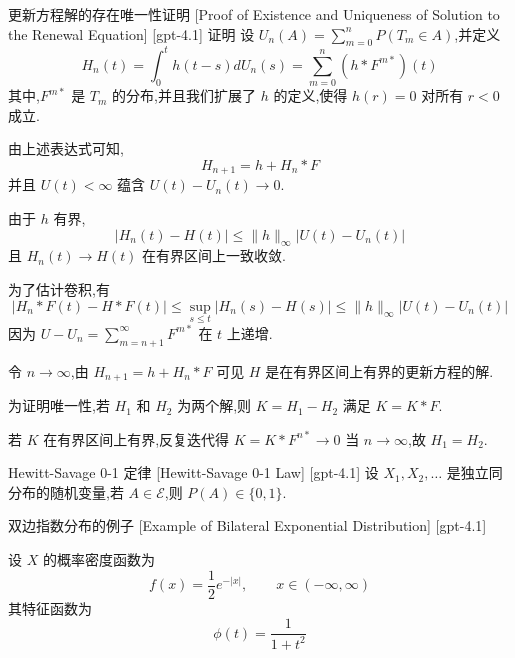 \documentclass[UTF8]{ctexart}
\begin{document}
    \begin{prf}
        {更新方程解的存在唯一性证明}
        [Proof of Existence and Uniqueness of Solution to the Renewal Equation]
        [gpt-4.1]
        证明 设 $U _ { n } ( A ) = \sum _ { m = 0 } ^ { n } P ( T _ { m } \in A )$,并定义
\[
H _ { n } ( t ) = \int _ { 0 } ^ { t } h ( t - s ) d U _ { n } ( s ) = \sum _ { m = 0 } ^ { n } \left( h * F ^ { m * } \right) ( t )
\]
其中,$F ^ { m * }$ 是 $T _ { m }$ 的分布,并且我们扩展了 $h$ 的定义,使得 $h ( r ) = 0$ 对所有 $r < 0$ 成立.

由上述表达式可知,
\[
H _ { n + 1 } = h + H _ { n } * F
\]
并且 $U ( t ) < \infty$ 蕴含 $U ( t ) - U _ { n } ( t ) \to 0$.

由于 $h$ 有界,
\[
| H _ { n } ( t ) - H ( t ) | \leq \| h \| _ { \infty } | U ( t ) - U _ { n } ( t ) |
\]
且 $H _ { n } ( t ) \to H ( t )$ 在有界区间上一致收敛.

为了估计卷积,有
\[
| H _ { n } * F ( t ) - H * F ( t ) | \le \sup _ { s \le t } | H _ { n } ( s ) - H ( s ) | \le \| h \| _ { \infty } | U ( t ) - U _ { n } ( t ) |
\]
因为 $U - U _ { n } = \sum _ { m = n + 1 } ^ { \infty } F ^ { m * }$ 在 $t$ 上递增.

令 $n \to \infty$,由 $H _ { n + 1 } = h + H _ { n } * F$ 可见 $H$ 是在有界区间上有界的更新方程的解.

为证明唯一性,若 $H _ { 1 }$ 和 $H _ { 2 }$ 为两个解,则 $K = H _ { 1 } - H _ { 2 }$ 满足 $K = K * F$.

若 $K$ 在有界区间上有界,反复迭代得 $K = K * F ^ { n * } \to 0$ 当 $n \to \infty$,故 $H _ { 1 } = H _ { 2 }$.

    \end{prf}
    
    
    
    \begin{thm}
        {Hewitt-Savage 0-1 定律}
        [Hewitt-Savage 0-1 Law]
        [gpt-4.1]
        设 $X_1, X_2, \dots$ 是独立同分布的随机变量,若 $A \in \mathcal{E}$,则 $P(A) \in \{0, 1\}$.
    \end{thm}
    
    
    
    \begin{xmp}
        {双边指数分布的例子}
        [Example of Bilateral Exponential Distribution]
        [gpt-4.1]
        
设 $X$ 的概率密度函数为
\[
f(x) = \frac{1}{2} e^{-|x|}, \qquad x \in (-\infty, \infty)
\]
其特征函数为
\[
\phi(t) = \frac{1}{1 + t^2}
\]

    \end{xmp}
    
\end{document}
